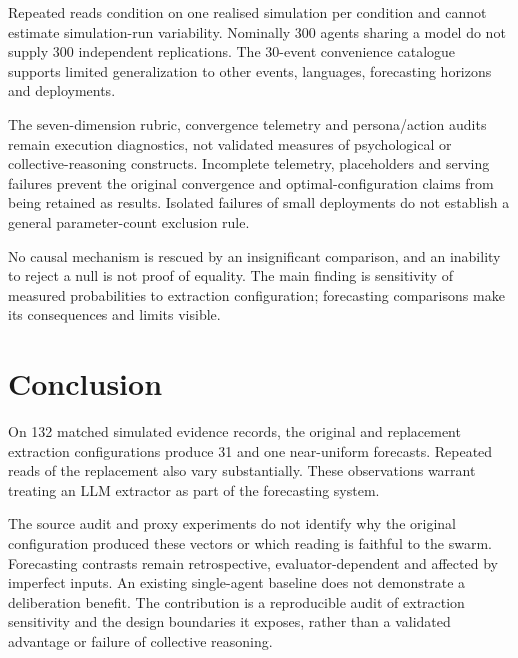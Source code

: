 \documentclass[10pt,conference]{IEEEtran}
\begin{document}
Repeated reads condition on one realised simulation per condition and cannot
estimate simulation-run variability. Nominally 300 agents sharing a model do
not supply 300 independent replications. The 30-event convenience catalogue
supports limited generalization to other events, languages, forecasting horizons
and deployments.

The seven-dimension rubric, convergence telemetry and persona/action audits
remain execution diagnostics, not validated measures of psychological or
collective-reasoning constructs. Incomplete telemetry, placeholders and serving
failures prevent the original convergence and optimal-configuration claims
from being retained as results. Isolated failures of small deployments do not
establish a general parameter-count exclusion rule.

No causal mechanism is rescued by an insignificant comparison, and an inability
to reject a null is not proof of equality. The main finding is sensitivity of
measured probabilities to extraction configuration; forecasting comparisons
make its consequences and limits visible.

\section{Conclusion}
On 132 matched simulated evidence records, the original and replacement
extraction configurations produce 31 and one near-uniform forecasts. Repeated
reads of the replacement also vary substantially. These observations warrant
treating an LLM extractor as part of the forecasting system.

The source audit and proxy experiments do not identify why the original
configuration produced these vectors or which reading is faithful to the
swarm. Forecasting contrasts remain retrospective, evaluator-dependent and
affected by imperfect inputs. An existing single-agent baseline does not
demonstrate a deliberation benefit. The contribution is a reproducible audit
of extraction sensitivity and the design boundaries it exposes, rather than
a validated advantage or failure of collective reasoning.

\appendices
\end{document}
